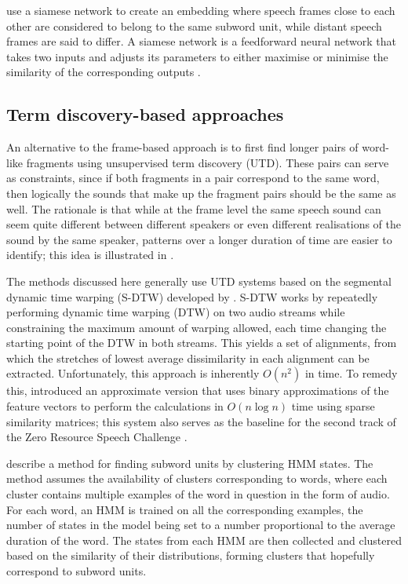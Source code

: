 \textcite{synnaeve2016temporal} use a siamese network to create an embedding where speech frames close to each other are considered to belong to the same subword unit, while distant speech frames are said to differ.
A siamese network is a feedforward neural network that takes two inputs and adjusts its parameters to either maximise or minimise the similarity of the corresponding outputs \parencite{bromley1994signature}.

\subsection{Term discovery-based approaches}

An alternative to the frame-based approach is to first find longer pairs of word-like fragments using unsupervised term discovery (UTD).
These pairs can serve as constraints, since if both fragments in a pair correspond to the same word, then logically the sounds that make up the fragment pairs should be the same as well.
The rationale is that while at the frame level the same speech sound can seem quite different between different speakers or even different realisations of the sound by the same speaker, patterns over a longer duration of time are easier to identify; this idea is illustrated in \textcite{jansen2013weak}.

The methods discussed here generally use UTD systems based on the segmental dynamic time warping (S-DTW) developed by \textcite{park2008unsupervised}.
S-DTW works by repeatedly performing dynamic time warping (DTW) on two audio streams while constraining the maximum amount of warping allowed, each time changing the starting point of the DTW in both streams.
This yields a set of alignments, from which the stretches of lowest average dissimilarity in each alignment can be extracted.
Unfortunately, this approach is inherently $O(n^2)$ in time.
To remedy this, \textcite{jansen2011efficient} introduced an approximate version that uses binary approximations of the feature vectors to perform the calculations in $O(n \log n)$ time using sparse similarity matrices; this system also serves as the baseline for the second track of the Zero Resource Speech Challenge \parencite{versteegh2015zero}.

\textcite{jansen2011towards} describe a method for finding subword units by clustering HMM states.
The method assumes the availability of clusters corresponding to words, where each cluster contains multiple examples of the word in question in the form of audio.
For each word, an HMM is trained on all the corresponding examples, the number of states in the model being set to a number proportional to the average duration of the word.
The states from each HMM are then collected and clustered based on the similarity of their distributions, forming clusters that hopefully correspond to subword units.

